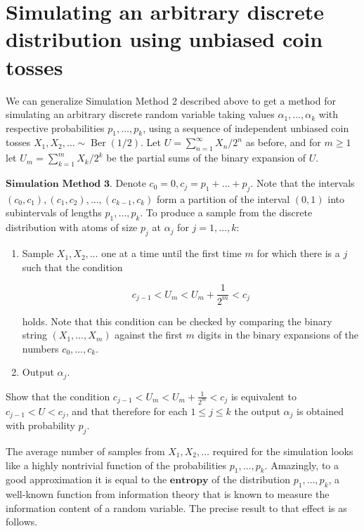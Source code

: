 \section{Simulating an arbitrary discrete distribution using unbiased coin tosses}

We can generalize Simulation Method 2 described above
to get a method for simulating an arbitrary discrete
random variable taking values
$\alpha_1,\ldots,\alpha_k$ with respective
probabilities $p_1,\ldots,p_k$, using a sequence of
independent unbiased coin tosses
$X_1,X_2,\ldots \sim \operatorname{Ber}(1/2)$. Let
$U=\sum_{n=1}^\infty X_n/2^n$ as before, and for
$m\ge 1$ let $U_m = \sum_{k=1}^m X_k/2^k$ be the
partial sums of the binary expansion of $U$.

$\textbf{Simulation Method 3.}$ Denote
$c_0 = 0, c_j = p_1+\ldots+p_j$. Note that the
intervals $(c_0,c_1), (c_1,c_2),\ldots, (c_{k-1},c_k)$
form a partition of the interval $(0,1)$ into
subintervals of lengths $p_1,\ldots,p_k$. To produce
a sample from the discrete distribution with atoms of
size $p_j$ at $\alpha_j$ for $j=1,\ldots,k$:

\begin{enumerate}[label=\arabic*.]
\item Sample $X_1,X_2,\ldots$ one at a time until the first
time $m$ for which there is a $j$ such that the
condition

\[
c_{j-1} < U_m < U_m+\frac{1}{2^m} < c_j
\]

\noindent holds. Note that this condition can be checked by
comparing the binary string $(X_1,\ldots,X_m)$
against the first $m$ digits in the binary expansions
of the numbers $c_0,\ldots,c_k$.

\item Output $\alpha_j$.
\end{enumerate}

\begin{xexercise}
Show that the condition
$c_{j-1} < U_m < U_m+\frac{1}{2^m} < c_j$ is
equivalent to $c_{j-1} < U < c_j$, and that therefore
for each $1\le j\le k$ the output $\alpha_j$ is
obtained with probability $p_j$.
\end{xexercise}

\noindent The average number of samples from $X_1,X_2,\ldots$
required for the simulation looks like a highly
nontrivial function of the probabilities
$p_1,\ldots,p_k$. Amazingly, to a good approximation
it is equal to the $\textbf{entropy}$ of the
distribution $p_1,\ldots,p_k$, a well-known function
from information theory that is known to measure the
information content of a random variable. The precise
result to that effect is as follows.

